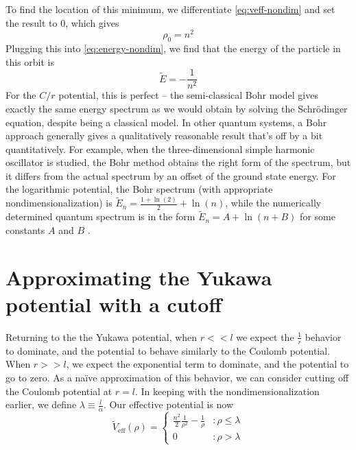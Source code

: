 \documentclass[12pt,twoside]{reedthesis}
\newcommand{\eqn}[1]{\begin{equation}#1\end{equation}}
\begin{document}
To find the location of this minimum, we differentiate \eqref{eq:veff-nondim} and set the result to $0$, which gives
\eqn{
\rho_0 = n^2
\label{eq:rho-n}
}
Plugging this into \eqref{eq:energy-nondim}, we find that the energy of the particle in this orbit is
\eqn{
\tilde{E} = -\frac{1}{n^2}
}
For the $C/r$ potential, this is perfect -- the semi-classical Bohr model gives exactly the same energy spectrum as we would obtain by solving the Schr\"odinger equation, despite being a classical model. In other quantum systems, a Bohr approach generally gives a qualitatively reasonable result that's off by a bit quantitatively. For example, when the three-dimensional simple harmonic oscillator is studied, the Bohr method obtains the right form of the spectrum, but it differs from the actual spectrum by an offset of the ground state energy. For the logarithmic potential, the Bohr spectrum (with appropriate nondimensionalization) is $\tilde{E}_n = \frac{1 + \ln(2)}{2}+\ln(n)$, while the numerically determined quantum spectrum is in the form $\tilde{E}_n = A + \ln(n+B)$ for some constants $A$ and $B$ \cite{Garon}.

\section{Approximating the Yukawa potential with a cutoff}

Returning to the the Yukawa potential, when $r << l$ we expect the $\frac{1}{r}$ behavior to dominate, and the potential to behave similarly to the Coulomb potential. When $r >> l$, we expect the exponential term to dominate, and the potential to go to zero. As a na\"ive approximation of this behavior, we can consider cutting off the Coulomb potential at $r = l$. In keeping with the nondimensionalization earlier, we define $\lambda \equiv \frac{l}{\alpha}$. Our effective potential is now
\eqn{
\tilde{V}_{\mathrm{eff}}(\rho) = \left\{
\begin{array}{lr}
 \frac{n^2}{2}\frac{1}{\rho^2}-\frac{1}{\rho} & : \rho \leq \lambda \\
0 & : \rho > \lambda
\end{array}
\right.
\label{eq:naive}
}
\end{document}
